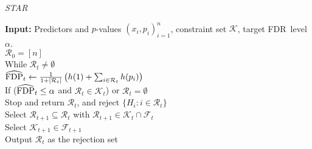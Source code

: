 \documentclass{biometrika}
\newcommand{\cF}{\mathcal{F}}
\newcommand{\cR}{\mathcal{R}}
\newcommand{\cK}{\mathcal{K}}
\newcommand{\textFDR}{FDR}
\newcommand{\Star}{STAR}
\newcommand{\hFDP}{\widehat{\textnormal{FDP}}}
\newcommand{\lb}{\left(}
\newcommand{\rb}{\right)}
\newcommand{\1}{\mathbf{1}}
\begin{document}
\begin{algo}\label{algo:STARKt}
  {\em \Star}
  \begin{tabbing}
  \quad \textbf{Input: }Predictors and $p$-values $(x_{i}, p_{i})_{i=1}^{n}$, constraint set $\cK$, target \textFDR ~level $\alpha$.\\
  \quad $\cR_{0} = [n]$\\
  \quad While $\cR_{t}\not= \emptyset$\\
      \quad \qquad\enspace $\hFDP_{t}\gets \frac{1}{1 + |\cR_{t}|}\lb h(1) + \sum_{i\in \cR_{t}}h(p_{i})\rb$\\
      \quad \qquad \enspace If ($\hFDP_{t} \le \alpha$ and $\cR_t \in \cK_t$) or $\cR_t = \emptyset$\\
      \quad \qquad \qquad\enspace Stop and return $\cR_t$, and reject $\{H_{i}: i\in \cR_{t}\}$\\
      \quad \qquad\enspace Select $\cR_{t+1}\subseteq\cR_{t}$ with $\cR_{t+1}\in \cK_{t}\cap \cF_{t}$\\
      \quad \qquad\enspace Select $\cK_{t+1}\in\cF_{t+1}$\\
  \quad Output $\cR_{t}$ as the rejection set\\
  \end{tabbing}
\end{algo}
\end{document}
